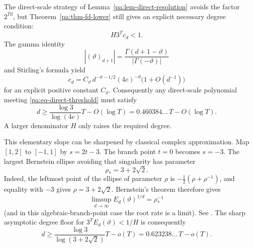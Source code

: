 \documentclass[11pt,oneside]{article}
\theoremstyle{definition}
\theoremstyle{remark}
\newcommand{\thetaq}{\vartheta}
\newcommand{\fall}[2]{\left(#1\right)_{\!\underline{#2}}}
\begin{document}
The direct-scale strategy of Lemma~\ref{pa:lem-direct-resolution} avoids the factor
\(2^{Td}\), but Theorem~\ref{pa:thm-fd-lower} still gives an explicit necessary degree
condition:
\begin{equation}
 H3^T c_d<1.
 \label{pa:eq-direct-cd-condition}
\end{equation}
The gamma identity
\begin{equation}
 |\fall{\thetaq}{d+1}|
 =\frac{\Gamma(d+1-\thetaq)}{|\Gamma(-\thetaq)|}
 \label{pa:eq-falling-gamma}
\end{equation}
and Stirling's formula yield
\begin{equation}
 c_d=C_{\thetaq}\,d^{-\thetaq-1/2}(4e)^{-d}
 \bigl(1+O(d^{-1})\bigr)
 \label{pa:eq-cd-asymptotic}
\end{equation}
for an explicit positive constant \(C_{\thetaq}\).  Consequently any direct-scale polynomial
meeting \eqref{pa:eq-direct-threshold} must satisfy
\begin{equation}
 d\ge
 \frac{\log3}{\log(4e)}T-O(\log T)
 =0.460384\ldots\,T-O(\log T).
 \label{pa:eq-direct-degree-floor}
\end{equation}
A larger denominator \(H\) only raises the required degree.

This elementary slope can be sharpened by classical complex approximation.  Map
\([1,2]\) to \([-1,1]\) by \(s=2t-3\).  The branch point \(t=0\) becomes \(s=-3\).  The
largest Bernstein ellipse avoiding that singularity has parameter
\begin{equation}
 \rho_* =3+2\sqrt2.
 \label{pa:eq-rho-star}
\end{equation}
Indeed, the leftmost point of the ellipse of parameter \(\rho\) is
\(-\tfrac12(\rho+\rho^{-1})\), and equality with \(-3\) gives
\(\rho=3+2\sqrt2\).  Bernstein's theorem therefore gives
\begin{equation}
 \limsup_{d\to\infty} E_d(\thetaq)^{1/d}=\rho_*^{-1}
 \label{pa:eq-Bernstein-rate}
\end{equation}
(and in this algebraic-branch-point case the root rate is a limit).  See
\cite{TrefethenApprox}.  The sharp asymptotic degree floor for
\(3^T E_d(\thetaq)<1/H\) is consequently
\begin{equation}
 d\ge
 \frac{\log3}{\log(3+2\sqrt2)}T-o(T)
 =0.623238\ldots\,T-o(T).
 \label{pa:eq-sharp-direct-degree}
\end{equation}
\end{document}
